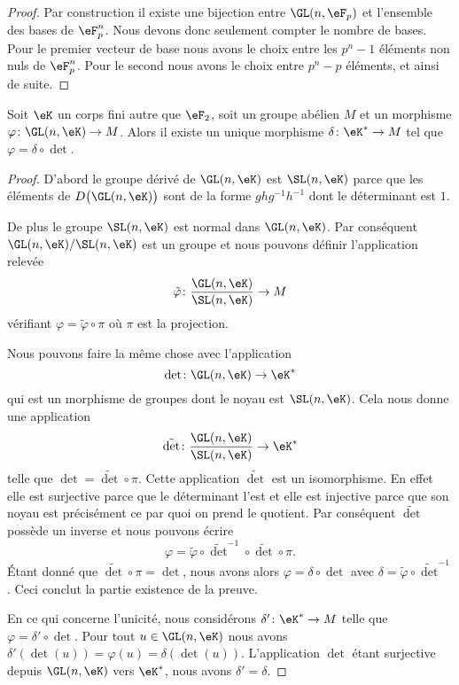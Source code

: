 \begin{proof}
	Par construction il existe une bijection entre \( \GL(n,\eF_p)\) et l'ensemble des bases de \( \eF_p^n\). Nous devons donc seulement compter le nombre de bases. Pour le premier vecteur de base nous avons le choix entre les \( p^n-1\) éléments non nuls de \( \eF_p^n\). Pour le second nous avons le choix entre \( p^n-p\) éléments, et ainsi de suite.
\end{proof}

\begin{lemma}   \label{LemcDOTzM}
	Soit \( \eK\) un corps fini autre que \( \eF_2\), soit un groupe abélien \( M\) et un morphisme \( \varphi\colon \GL(n,\eK)\to M\). Alors il existe un unique morphisme \( \delta\colon \eK^*\to M\) tel que \( \varphi=\delta\circ\det\).
\end{lemma}

\begin{proof}
	D'abord le groupe dérivé de \( \GL(n,\eK)\) est \( \SL(n,\eK)\) parce que les éléments de \( D\big( \GL(n,\eK) \big)\) sont de la forme \( ghg^{-1}h^{-1}\) dont le déterminant est \( 1\).

	De plus le groupe \( \SL(n,\eK)\) est normal dans \( \GL(n,\eK)\). Par conséquent \( \GL(n,\eK)/\SL(n,\eK)\) est un groupe et nous pouvons définir l'application relevée
	\begin{equation}
		\tilde \varphi\colon \frac{ \GL(n,\eK) }{ \SL(n,\eK) }\to M
	\end{equation}
	vérifiant \( \varphi=\tilde \varphi\circ\pi\) où \( \pi\) est la projection.

	Nous pouvons faire la même chose avec l'application
	\begin{equation}
		\det\colon \GL(n,\eK)\to \eK^*
	\end{equation}
	qui est un morphisme de groupes dont le noyau est \( \SL(n,\eK)\). Cela nous donne une application
	\begin{equation}
		\tilde \det\colon \frac{ \GL(n,\eK) }{ \SL(n,\eK) }\to \eK^*
	\end{equation}
	telle que \( \det=\tilde \det\circ\pi\). Cette application \( \tilde \det\) est un isomorphisme. En effet elle est surjective parce que le déterminant l'est et elle est injective parce que son noyau est précisément ce par quoi on prend le quotient. Par conséquent \( \tilde \det \) possède un inverse et nous pouvons écrire
	\begin{equation}
		\varphi=\tilde \varphi\circ\tilde \det^{-1}\circ\tilde \det\circ\pi.
	\end{equation}
	Étant donné que \( \tilde \det\circ\pi=\det\), nous avons alors \( \varphi=\delta\circ\det\) avec \( \delta=\tilde \varphi\circ\tilde \det^{-1}\). Ceci conclut la partie existence de la preuve.

	En ce qui concerne l'unicité, nous considérons \( \delta'\colon \eK^*\to M\) telle que \( \varphi=\delta'\circ\det\). Pour tout \( u\in \GL(n,\eK)\) nous avons \( \delta'(\det(u))=\varphi(u)=\delta(\det(u))\). L'application \( \det\) étant surjective depuis \( \GL(n,\eK)\) vers \( \eK^*\), nous avons \( \delta'=\delta\).
\end{proof}

